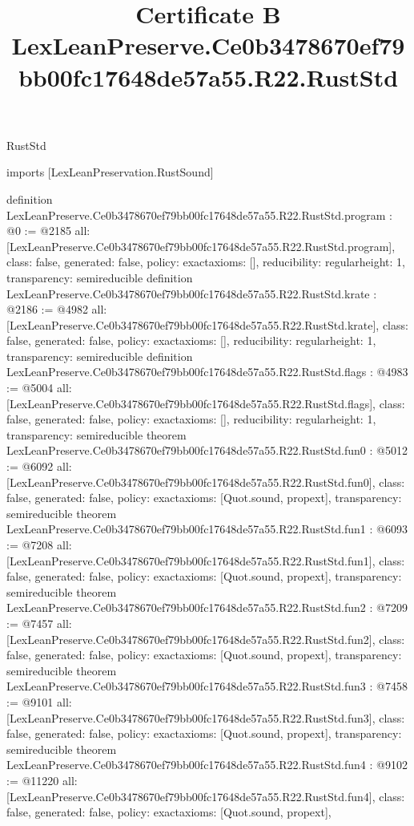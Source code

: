 \begin{lexlean}{RustStd}
\title{Certificate B LexLeanPreserve.Ce0b3478670ef79bb00fc17648de57a55.R22.RustStd}
\begin{coremodule}
imports [LexLeanPreservation.RustSound]

definition LexLeanPreserve.Ce0b3478670ef79bb00fc17648de57a55.R22.RustStd.program : @0 := @2185 {
  all: [LexLeanPreserve.Ce0b3478670ef79bb00fc17648de57a55.R22.RustStd.program],
  class: false,
  generated: false,
  policy: exact{axioms: []},
  reducibility: regular{height: 1},
  transparency: semireducible
}
definition LexLeanPreserve.Ce0b3478670ef79bb00fc17648de57a55.R22.RustStd.krate : @2186 := @4982 {
  all: [LexLeanPreserve.Ce0b3478670ef79bb00fc17648de57a55.R22.RustStd.krate],
  class: false,
  generated: false,
  policy: exact{axioms: []},
  reducibility: regular{height: 1},
  transparency: semireducible
}
definition LexLeanPreserve.Ce0b3478670ef79bb00fc17648de57a55.R22.RustStd.flags : @4983 := @5004 {
  all: [LexLeanPreserve.Ce0b3478670ef79bb00fc17648de57a55.R22.RustStd.flags],
  class: false,
  generated: false,
  policy: exact{axioms: []},
  reducibility: regular{height: 1},
  transparency: semireducible
}
theorem LexLeanPreserve.Ce0b3478670ef79bb00fc17648de57a55.R22.RustStd.fun0 : @5012 := @6092 {
  all: [LexLeanPreserve.Ce0b3478670ef79bb00fc17648de57a55.R22.RustStd.fun0],
  class: false,
  generated: false,
  policy: exact{axioms: [Quot.sound, propext]},
  transparency: semireducible
}
theorem LexLeanPreserve.Ce0b3478670ef79bb00fc17648de57a55.R22.RustStd.fun1 : @6093 := @7208 {
  all: [LexLeanPreserve.Ce0b3478670ef79bb00fc17648de57a55.R22.RustStd.fun1],
  class: false,
  generated: false,
  policy: exact{axioms: [Quot.sound, propext]},
  transparency: semireducible
}
theorem LexLeanPreserve.Ce0b3478670ef79bb00fc17648de57a55.R22.RustStd.fun2 : @7209 := @7457 {
  all: [LexLeanPreserve.Ce0b3478670ef79bb00fc17648de57a55.R22.RustStd.fun2],
  class: false,
  generated: false,
  policy: exact{axioms: [Quot.sound, propext]},
  transparency: semireducible
}
theorem LexLeanPreserve.Ce0b3478670ef79bb00fc17648de57a55.R22.RustStd.fun3 : @7458 := @9101 {
  all: [LexLeanPreserve.Ce0b3478670ef79bb00fc17648de57a55.R22.RustStd.fun3],
  class: false,
  generated: false,
  policy: exact{axioms: [Quot.sound, propext]},
  transparency: semireducible
}
theorem LexLeanPreserve.Ce0b3478670ef79bb00fc17648de57a55.R22.RustStd.fun4 : @9102 := @11220 {
  all: [LexLeanPreserve.Ce0b3478670ef79bb00fc17648de57a55.R22.RustStd.fun4],
  class: false,
  generated: false,
  policy: exact{axioms: [Quot.sound, propext]},
}
\end{coremodule}
\end{lexlean}

